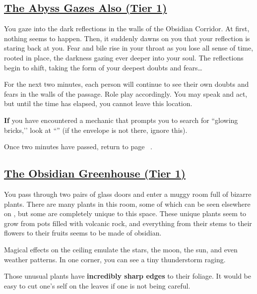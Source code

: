 \documentclass[sheet]{GL2020}
\begin{document}
\clearpage

\begin{center}\section*{\underline{The Abyss Gazes Also (Tier 1)}}\end{center}
\label{AbyssGazesAlso}

You gaze into the dark reflections in the walls of the Obsidian Corridor. At first, nothing seems to happen. Then, it suddenly dawns on you that your reflection is staring back at you. Fear and bile rise in your throat as you lose all sense of time, rooted in place, the darkness gazing ever deeper into your soul. The reflections begin to shift, taking the form of your deepest doubts and fears\ldots{}

For the next two minutes, each person will continue to see their own doubts and fears in the walls of the passage. Role play accordingly. You may speak and act, but until the time has elapsed, you cannot leave this location. 

\textbf{If} you have encountered a mechanic that prompts you to search for ``glowing bricks,’’ look at ``\sBlueBrickEightEnvelope{}'' (if the envelope is not there, ignore this).

Once two minutes have passed, return to page ~\pageref{ObsidianCorridor}. 



\clearpage

\begin{center}\section*{\underline{The Obsidian Greenhouse (Tier 1)}}\end{center}
\label{ObsidianGreenhouse}

You pass through two pairs of glass doors and enter a muggy room full of bizarre plants. There are many plants in this room, some of which can be seen elsewhere on \pEarth{}, but some are completely unique to this space. These unique plants seem to grow from pots filled with volcanic rock, and everything from their stems to their flowers to their fruits seems to be made of obsidian.

Magical effects on the ceiling emulate the stars, the moon, the sun, and even weather patterns. In one corner, you can see a tiny thunderstorm raging.

Those unusual plants have \textbf{incredibly sharp edges} to their foliage. It would be easy to cut one’s self on the leaves if one is not being careful.
\end{document}
